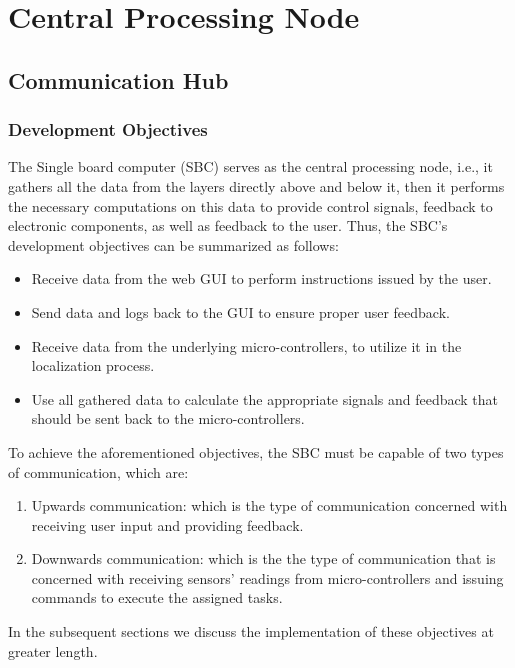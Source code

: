 \newpage
\part{Central Processing Node}
\newpage
\chapter{Communication Hub}
\label{ch:CPN-comm}

\section{Development Objectives}
The Single board computer (SBC) serves as the central processing node, i.e., it gathers all the data from the layers directly above and below it, then it performs the necessary computations on this data to provide control signals, feedback to electronic components, as well as feedback to the user. Thus, the SBC's development objectives can be summarized as follows:

\begin{itemize}
	\item Receive data from the web GUI to perform instructions issued by the user.
	\item Send data and logs back to the GUI to ensure proper user feedback.
	\item Receive data from the underlying micro-controllers, to utilize it in the localization process.
	\item Use all gathered data to calculate the appropriate signals and feedback that should be sent back to the micro-controllers.
\end{itemize}

To achieve the aforementioned objectives, the SBC must be capable of two types of communication, which are:
\begin{enumerate}
	\item Upwards communication: which is the type of communication concerned with receiving user input and providing feedback.
	\item Downwards communication: which is the the type of communication that is concerned with receiving sensors' readings from micro-controllers and issuing commands to execute the assigned tasks.
\end{enumerate}

In the subsequent sections we discuss the implementation of these objectives at greater length.

